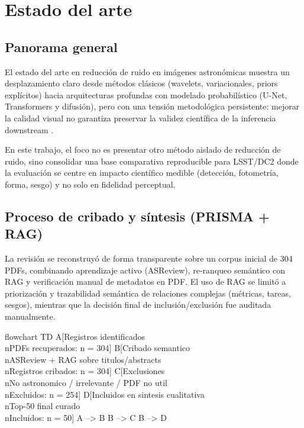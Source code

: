\chapter{Estado del arte}

\section{Panorama general}

El estado del arte en reducci\'on de ruido en im\'agenes astron\'omicas muestra un desplazamiento claro desde m\'etodos cl\'asicos (wavelets, variacionales, priors expl\'icitos) hacia arquitecturas profundas con modelado probabil\'istico (U-Net, Transformers y difusi\'on), pero con una tensi\'on metodol\'ogica persistente: mejorar la calidad visual no garantiza preservar la validez cient\'ifica de la inferencia downstream \cite{elad2023revolution, vojtekova2020unet, shirasaki2021noise, akhaury2025joint, guo2026detection}.

En este trabajo, el foco no es presentar otro m\'etodo aislado de reducci\'on de ruido, sino consolidar una base comparativa reproducible para LSST/DC2 donde la evaluaci\'on se centre en impacto cient\'ifico medible (detecci\'on, fotometr\'ia, forma, sesgo) y no solo en fidelidad perceptual.

\section{Proceso de cribado y s\'intesis (PRISMA + RAG)}

La revisi\'on se reconstruy\'o de forma transparente sobre un corpus inicial de 304 PDFs, combinando aprendizaje activo (ASReview), re-ranqueo sem\'antico con RAG y verificaci\'on manual de metadatos en PDF. El uso de RAG se limit\'o a priorizaci\'on y trazabilidad sem\'antica de relaciones complejas (m\'etricas, tareas, sesgos), mientras que la decisi\'on final de inclusi\'on/exclusi\'on fue auditada manualmente.

\begin{mermaid}[width=0.95\linewidth, caption={Diagrama PRISMA del cribado (corpus astron\'omico de reducci\'on de ruido)}, pos=t]
flowchart TD
    A[Registros identificados\\nPDFs recuperados: n = 304]
    B[Cribado semantico\\nASReview + RAG sobre titulos/abstracts\\nRegistros cribados: n = 304]
    C[Exclusiones\\nNo astronomico / irrelevante / PDF no util\\nExcluidos: n = 254]
    D[Incluidos en sintesis cualitativa\\nTop-50 final curado\\nIncluidos: n = 50]
    A --> B
    B --> C
    B --> D
\end{mermaid}

